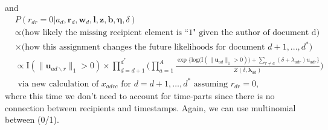 \documentclass[12pt,a4paper]{article}
\begin{document}
and
\begin{equation}
\begin{aligned}
&P(r_{dr} = 0|a_d, \boldsymbol{r}_d,\boldsymbol{w}_d, \boldsymbol{l}, \boldsymbol{z}, \boldsymbol{b}, \boldsymbol{\eta},\delta)\\& \propto \mbox{(how likely the missing recipient element is ``1" given the author of document d)} \\&\times \mbox{(how this assignment changes the future likelihoods for document }   d+1,...,d^*) 
\\&  \propto \text{I}(\lVert\boldsymbol{u}_{ad\backslash r}\rVert_1 > 0 )\times
\prod_{d=d+1}^{d^*}\Big(
\prod_{a=1}^A \frac{\exp\Big\{\mbox{log}\big(\text{I}( \lVert \boldsymbol{u}_{ad}\rVert_1 > 0)\big) + \sum\limits_{r \neq a} (\delta+\lambda_{adr})u_{adr}\Big\}}{Z(\delta,\boldsymbol{\lambda}_{ad})}\Big)\\& \mbox{ via new calculation of $x_{adrc}$ for $d=d+1,\ldots, d^*$ assuming $r_{dr}=0$},
\end{aligned}                                                                         
\end{equation}                                                                     
where this time we don't need to account for time-parts since there is no connection between recipients and timestamps. Again, we can use multinomial between (0/1).                         
                                                          
\end{document}
